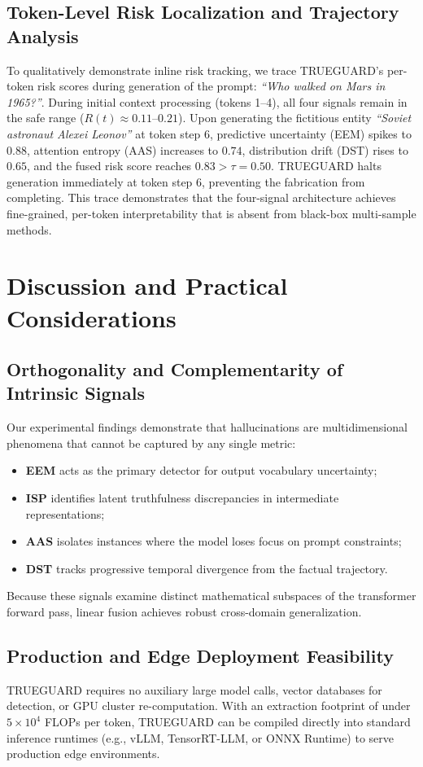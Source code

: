 \documentclass[journal]{IEEEtran}
\begin{document}
\subsection{Token-Level Risk Localization and Trajectory Analysis}
To qualitatively demonstrate inline risk tracking, we trace TRUEGUARD's per-token risk scores during generation of the prompt: \textit{``Who walked on Mars in 1965?''}. During initial context processing (tokens 1--4), all four signals remain in the safe range ($R(t) \approx 0.11$--$0.21$). Upon generating the fictitious entity \textit{``Soviet astronaut Alexei Leonov''} at token step 6, predictive uncertainty (EEM) spikes to $0.88$, attention entropy (AAS) increases to $0.74$, distribution drift (DST) rises to $0.65$, and the fused risk score reaches $0.83 > \tau = 0.50$. TRUEGUARD halts generation immediately at token step 6, preventing the fabrication from completing. This trace demonstrates that the four-signal architecture achieves fine-grained, per-token interpretability that is absent from black-box multi-sample methods.


\section{Discussion and Practical Considerations}

\subsection{Orthogonality and Complementarity of Intrinsic Signals}
Our experimental findings demonstrate that hallucinations are multidimensional phenomena that cannot be captured by any single metric:
\begin{itemize}
    \item \textbf{EEM} acts as the primary detector for output vocabulary uncertainty;
    \item \textbf{ISP} identifies latent truthfulness discrepancies in intermediate representations;
    \item \textbf{AAS} isolates instances where the model loses focus on prompt constraints;
    \item \textbf{DST} tracks progressive temporal divergence from the factual trajectory.
\end{itemize}
Because these signals examine distinct mathematical subspaces of the transformer forward pass, linear fusion achieves robust cross-domain generalization.

\subsection{Production and Edge Deployment Feasibility}
TRUEGUARD requires no auxiliary large model calls, vector databases for detection, or GPU cluster re-computation. With an extraction footprint of under $5 \times 10^4$ FLOPs per token, TRUEGUARD can be compiled directly into standard inference runtimes (e.g., vLLM, TensorRT-LLM, or ONNX Runtime) to serve production edge environments.
\end{document}
